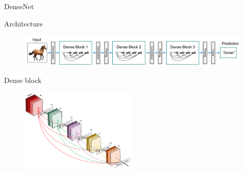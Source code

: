 \documentclass[xcolor=pdftex,dvipsnames,table,mathserif]{beamer}
\begin{document}
\begin{frame}{DenseNet\cite{huang_densely_2018}}


  \begin{block}{Architecture}
    \begin{figure}[ht]
      \centering
      \includegraphics[width=\textwidth]{densenet}
    \end{figure}

  \end{block}

  \begin{block}{Dense block}
    \begin{figure}[ht]
      \centering
      \includegraphics[width=0.5\textwidth]{densenet_block}
    \end{figure}
  \end{block}

\end{frame}


\end{document}
